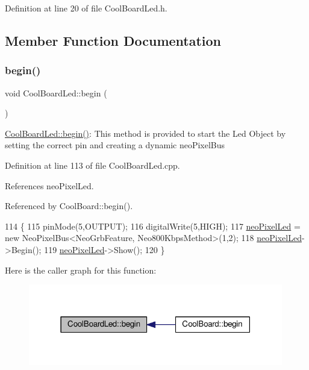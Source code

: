Definition at line 20 of file Cool\+Board\+Led.\+h.



\subsection{Member Function Documentation}
\mbox{\label{classCoolBoardLed_ae3cbde8affcc6f011cbd698c8ef911f6}} 
\subsubsection{\texorpdfstring{begin()}{begin()}}
{\footnotesize\ttfamily void Cool\+Board\+Led\+::begin (\begin{DoxyParamCaption}{ }\end{DoxyParamCaption})}

\hyperlink{classCoolBoardLed_ae3cbde8affcc6f011cbd698c8ef911f6}{Cool\+Board\+Led\+::begin()}\+: This method is provided to start the Led Object by setting the correct pin and creating a dynamic neo\+Pixel\+Bus 

Definition at line 113 of file Cool\+Board\+Led.\+cpp.



References neo\+Pixel\+Led.



Referenced by Cool\+Board\+::begin().


\begin{DoxyCode}
114 \{
115     pinMode(5,OUTPUT);
116     digitalWrite(5,HIGH);
117     \hyperlink{classCoolBoardLed_ac2c13fa462a010cd9242bf297c013923}{neoPixelLed} = \textcolor{keyword}{new} NeoPixelBus<NeoGrbFeature, Neo800KbpsMethod>(1,2); 
118     \hyperlink{classCoolBoardLed_ac2c13fa462a010cd9242bf297c013923}{neoPixelLed}->Begin();
119     \hyperlink{classCoolBoardLed_ac2c13fa462a010cd9242bf297c013923}{neoPixelLed}->Show();
120 \} 
\end{DoxyCode}
Here is the caller graph for this function\+:
\nopagebreak
\begin{figure}[H]
\begin{center}
\leavevmode
\includegraphics[width=315pt]{classCoolBoardLed_ae3cbde8affcc6f011cbd698c8ef911f6_icgraph}
\end{center}
\end{figure}
\mbox{\label{classCoolBoardLed_a27706bc029f6a126c55d0b91624ad7fa}} 
